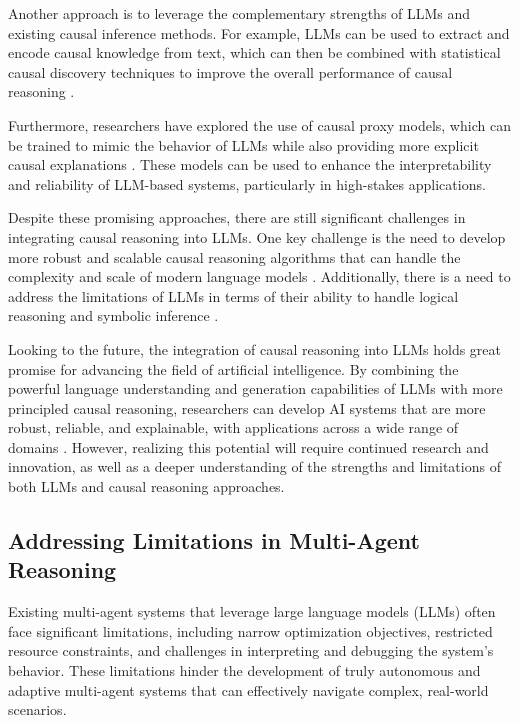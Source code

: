 \documentclass[11pt]{article}
\begin{document}
Another approach is to leverage the complementary strengths of LLMs and existing causal inference methods. For example, LLMs can be used to extract and encode causal knowledge from text, which can then be combined with statistical causal discovery techniques to improve the overall performance of causal reasoning \cite{ref334}.

Furthermore, researchers have explored the use of causal proxy models, which can be trained to mimic the behavior of LLMs while also providing more explicit causal explanations \cite{ref335}. These models can be used to enhance the interpretability and reliability of LLM-based systems, particularly in high-stakes applications.

Despite these promising approaches, there are still significant challenges in integrating causal reasoning into LLMs. One key challenge is the need to develop more robust and scalable causal reasoning algorithms that can handle the complexity and scale of modern language models \cite{ref336}. Additionally, there is a need to address the limitations of LLMs in terms of their ability to handle logical reasoning and symbolic inference \cite{ref337,ref338}.

Looking to the future, the integration of causal reasoning into LLMs holds great promise for advancing the field of artificial intelligence. By combining the powerful language understanding and generation capabilities of LLMs with more principled causal reasoning, researchers can develop AI systems that are more robust, reliable, and explainable, with applications across a wide range of domains \cite{ref339,ref340}. However, realizing this potential will require continued research and innovation, as well as a deeper understanding of the strengths and limitations of both LLMs and causal reasoning approaches.

\subsection{Addressing Limitations in Multi-Agent Reasoning}

Existing multi-agent systems that leverage large language models (LLMs) often face significant limitations, including narrow optimization objectives, restricted resource constraints, and challenges in interpreting and debugging the system's behavior. These limitations hinder the development of truly autonomous and adaptive multi-agent systems that can effectively navigate complex, real-world scenarios.
\end{document}
